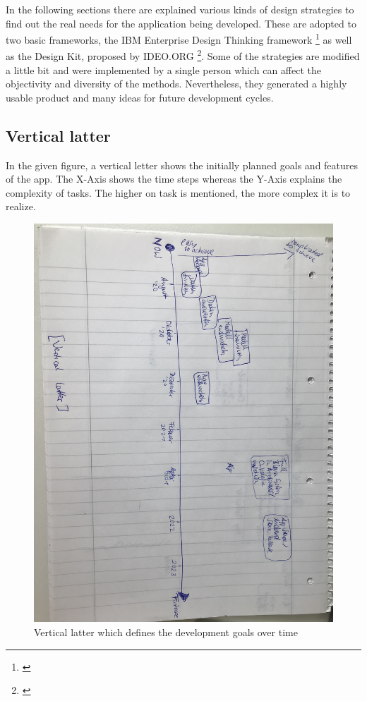 In the following sections there are explained various kinds of design strategies to find out the real needs for the application being developed. These are adopted to two basic frameworks, the IBM Enterprise Design Thinking framework \footnote{\cite{ibm_edt}} as well as the Design Kit, proposed by IDEO.ORG \footnote{\cite{design_kit}}. Some of the strategies are modified a little bit and were implemented by a single person which can affect the objectivity and diversity of the methods. Nevertheless, they generated a highly usable product and many ideas for future development cycles. 

\subsection{Vertical latter}

In the given figure, a vertical letter shows the initially planned goals and features of the app. The X-Axis shows the time steps whereas the Y-Axis explains the complexity of tasks. The higher on task is mentioned, the more complex it is to realize.

\begin{figure}[h!]
	\centering
	\includegraphics[width=1\textwidth]{images/verticallatter.jpg}
	\caption{Vertical latter which defines the development goals over time}
	\label{verticallatter}
\end{figure}

